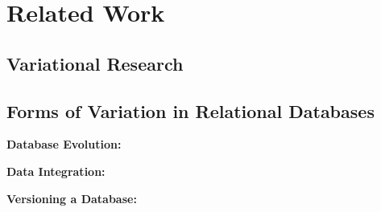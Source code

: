 \section{Related Work}
\label{sec:rw}

\subsection{Variational Research}
\label{sec:var-res}

\subsection{Forms of Variation in Relational Databases}
\label{sec:var-in-db}

\textbf{Database Evolution:}

\textbf{Data Integration:}

\textbf{Versioning a Database:}


